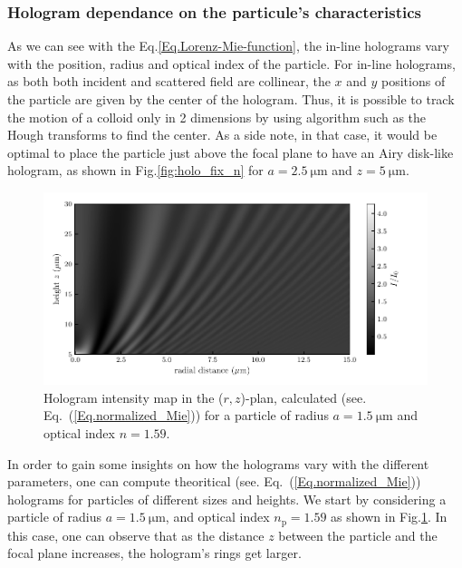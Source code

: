 \subsubsection{Hologram dependance on the particule's  characteristics}



As we can see with the Eq.\ref{Eq.Lorenz-Mie-function}, the in-line holograms vary with the position, radius and optical index of the particle. For in-line holograms, as both both incident and scattered field are collinear, the $x$ and $y$ positions of the particle are given by the center of the hologram. Thus, it is possible to track the motion of a colloid only in 2 dimensions by using algorithm such as the Hough transforms to find the center. As a side note, in that case, it would be optimal to place the particle just above the focal plane to have an Airy disk-like hologram, as shown in Fig.\ref{fig:holo_fix_n} for $a = 2.5 ~ \mathrm{\mu m}$ and $z = 5 ~\mathrm{\mu m}$.

\begin{figure}[H]
	\centering
	\includegraphics{02_body/chapter2/images/holo_size_exemple/holos_only_z.pdf}
	\caption{Hologram intensity map in the ($r,z$)-plan, calculated (see. Eq.~(\ref{Eq.normalized_Mie})) for a particle of radius $a = 1.5 ~\mathrm{\mu m}$ and optical index $n = 1.59$.}
	\label{fig:holo_onlyz}
\end{figure}

In order to gain some insights on how the holograms vary with the different parameters, one can compute theoritical (see. Eq.~(\ref{Eq.normalized_Mie})) holograms for particles of different sizes and heights. We start by considering a particle of radius $a = 1.5 ~ \mathrm{\mu m} $, and optical index $n_\mathrm{p}= 1.59 $ as shown in Fig.\ref{fig:holo_onlyz}. In this case, one can observe that as the distance $z$ between the particle and the focal plane increases, the hologram's rings get larger.

